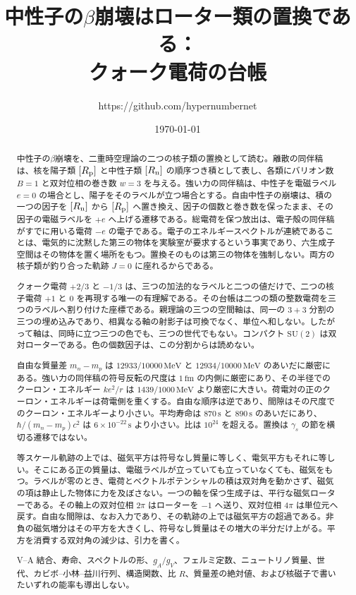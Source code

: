 \documentclass[a4paper]{article}
\title{中性子の\(\beta\)崩壊はローター類の置換である：\\
クォーク電荷の台帳}
\author{https://github.com/hypernumbernet}
\date{\today}
\begin{document}
\maketitle

\begin{abstract}
中性子の\(\beta\)崩壊を、二重時空理論の二つの核子類の置換として読む。離散の同伴稿は、核を陽子類 \([R_{\rm p}]\) と中性子類 \([R_{\rm n}]\) の順序つき積として表し、各類にバリオン数 \(B=1\) と双対位相の巻き数 \(w=3\) を与える。強い力の同伴稿は、中性子を電磁ラベル \(e=0\) の場合とし、陽子をそのラベルが立つ場合とする。自由中性子の崩壊は、積の一つの因子を \([R_{\rm n}]\) から \([R_{\rm p}]\) へ置き換え、因子の個数と巻き数を保ったまま、その因子の電磁ラベルを \(+e\) へ上げる遷移である。総電荷を保つ放出は、電子殻の同伴稿がすでに用いる電荷 \(-e\) の電子である。電子のエネルギースペクトルが連続であることは、電気的に沈黙した第三の物体を実験室が要求するという事実であり、六生成子空間はその物体を置く場所をもつ。置換そのものは第三の物体を強制しない。両方の核子類が釣り合った軌跡 \(J=0\) に座れるからである。

クォーク電荷 \(+2/3\) と \(-1/3\) は、三つの加法的なラベルと二つの値だけで、二つの核子電荷 \(+1\) と \(0\) を再現する唯一の有理解である。その台帳は二つの類の整数電荷を三つのラベルへ割り付けた座標である。親理論の三つの空間軸は、同一の \(3+3\) 分割の三つの埋め込みであり、相異なる軸の射影子は可換でなく、単位へ和しない。したがって軸は、同時に立つ三つの色でも、三つの世代でもない。コンパクト \(\mathrm{SU}(2)\) は双対ローターである。色の個数因子は、この分割からは読めない。

自由な質量差 \(m_n-m_p\) は \(12933/10000\,\mathrm{MeV}\) と \(12934/10000\,\mathrm{MeV}\) のあいだに厳密にある。強い力の同伴稿の符号反転の尺度は \(1\,\mathrm{fm}\) の内側に厳密にあり、その半径でのクーロン・エネルギー \(ke^{2}/r\) は \(1439/1000\,\mathrm{MeV}\) より厳密に大きい。荷電対の正のクーロン・エネルギーは荷電側を重くする。自由な順序は逆であり、間隙はその尺度でのクーロン・エネルギーより小さい。平均寿命は \(870\,\mathrm{s}\) と \(890\,\mathrm{s}\) のあいだにあり、\(\hbar/(m_n-m_p)c^{2}\) は \(6\times 10^{-22}\,\mathrm{s}\) より小さい。比は \(10^{24}\) を超える。置換は \(\gamma_s\) の節を横切る遷移ではない。

等スケール軌跡の上では、磁気平方は符号なし質量に等しく、電気平方もそれに等しい。そこにある正の質量は、電磁ラベルが立っていても立っていなくても、磁気をもつ。ラベルが零のとき、電荷とベクトルポテンシャルの積は双対角を動かさず、磁気の項は静止した物体に力を及ぼさない。一つの軸を保つ生成子は、平行な磁気ローターである。その軸上の双対位相 \(2\pi\) はローターを \(-1\) へ送り、双対位相 \(4\pi\) は単位元へ戻す。自由な間隙は、なお入力であり、その軌跡の上では磁気平方の超過である。非負の磁気増分はその平方を大きくし、符号なし質量はその増大の半分だけ上がる。平方を消費する双対角の減少は、引力を書く。

V--A 結合、寿命、スペクトルの形、\(g_A/g_V\)、フェルミ定数、ニュートリノ質量、世代、カビボ--小林--益川行列、構造関数、比 \(R\)、質量差の絶対値、および核磁子で書いたいずれの能率も導出しない。
\end{abstract}
\end{document}
